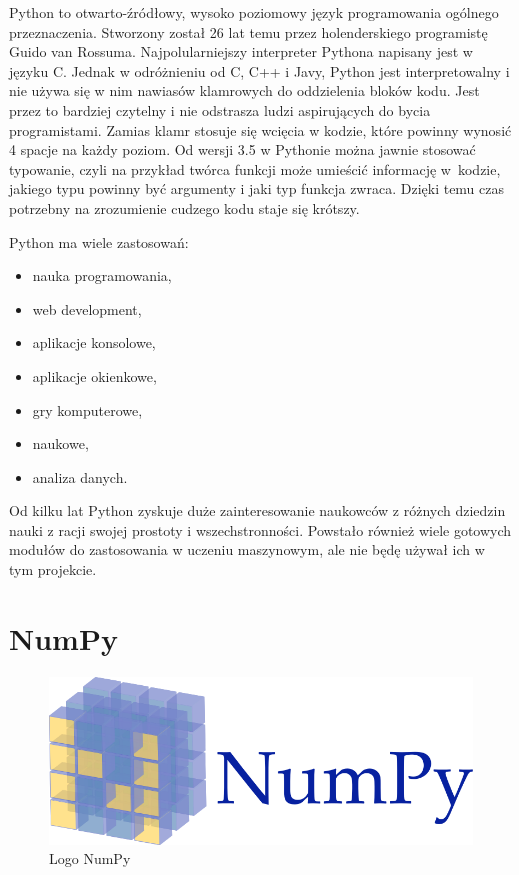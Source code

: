     Python to otwarto-źródłowy, wysoko poziomowy język programowania ogólnego przeznaczenia.
    Stworzony został 26 lat temu przez holenderskiego programistę Guido van Rossuma.
    Najpolularniejszy interpreter Pythona napisany jest w języku C.
    Jednak w odróżnieniu od C, C++ i Javy, Python jest interpretowalny i nie używa się w nim nawiasów klamrowych do oddzielenia bloków kodu.
    Jest przez to bardziej czytelny i nie odstrasza ludzi aspirujących do bycia programistami.
    Zamias klamr stosuje się wcięcia w kodzie, które powinny wynosić 4 spacje na każdy poziom.
    Od wersji 3.5 w Pythonie można jawnie stosować typowanie, czyli na przykład twórca funkcji może umieścić informację w~kodzie, jakiego typu powinny być argumenty i jaki typ funkcja zwraca.
    Dzięki temu czas potrzebny na zrozumienie cudzego kodu staje się krótszy.

    Python ma wiele zastosowań:

    \begin{itemize}
        \item nauka programowania,
        \item web development,
        \item aplikacje konsolowe,
        \item aplikacje okienkowe,
        \item gry komputerowe,
        \item naukowe,
        \item analiza danych.
    \end{itemize}

    Od kilku lat Python zyskuje duże zainteresowanie naukowców z różnych dziedzin nauki z racji swojej prostoty i wszechstronności.
    Powstało również wiele gotowych modułów do zastosowania w uczeniu maszynowym, ale nie będę używał ich w tym projekcie.

    \section{NumPy}\label{sec:numpy}

    \begin{figure}[htp]
        \centering
        \includegraphics[scale=0.4]{./img/numpy-logo.png}
        \caption{Logo NumPy}
    \end{figure}


